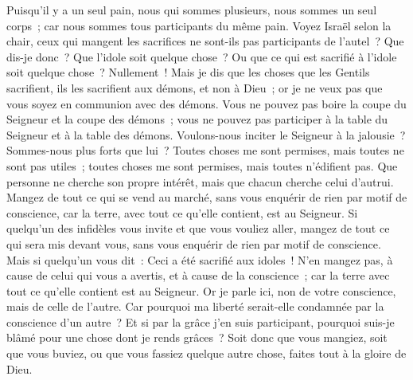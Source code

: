 \begin{multicols}{2}
Puisqu'il y a un seul pain, nous qui sommes plusieurs, nous sommes un seul corps~; car nous sommes tous participants du même pain.
Voyez Israël selon la chair, ceux qui mangent les sacrifices ne sont-ils pas participants de l'autel~?
Que dis-je donc~? Que l'idole soit quelque chose~? Ou que ce qui est sacrifié à l'idole soit quelque chose~? Nullement~!
Mais je dis que les choses que les Gentils sacrifient, ils les sacrifient aux démons, et non à Dieu~; or je ne veux pas que vous soyez en communion avec des démons.
Vous ne pouvez pas boire la coupe du Seigneur et la coupe des démons~; vous ne pouvez pas participer à la table du Seigneur et à la table des démons.
Voulons-nous inciter le Seigneur à la jalousie~? Sommes-nous plus forts que lui~?
Toutes choses me sont permises, mais toutes ne sont pas utiles~; toutes choses me sont permises, mais toutes n'édifient pas.
Que personne ne cherche son propre intérêt, mais que chacun cherche celui d'autrui.
Mangez de tout ce qui se vend au marché, sans vous enquérir de rien par motif de conscience,
car la terre, avec tout ce qu'elle contient, est au Seigneur.
Si quelqu'un des infidèles vous invite et que vous vouliez aller, mangez de tout ce qui sera mis devant vous, sans vous enquérir de rien par motif de conscience.
Mais si quelqu'un vous dit~: Ceci a été sacrifié aux idoles~! N'en mangez pas, à cause de celui qui vous a avertis, et à cause de la conscience~; car la terre avec tout ce qu'elle contient est au Seigneur.
Or je parle ici, non de votre conscience, mais de celle de l'autre. Car pourquoi ma liberté serait-elle condamnée par la conscience d'un autre~?
Et si par la grâce j'en suis participant, pourquoi suis-je blâmé pour une chose dont je rends grâces~?
Soit donc que vous mangiez, soit que vous buviez, ou que vous fassiez quelque autre chose, faites tout à la gloire de Dieu.

\end{multicols}

